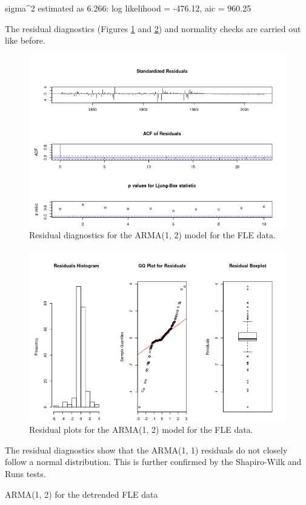 \begin{enumerate}[label=(\alph*)]
\begin{block}
sigma^2 estimated as 6.266:  log likelihood = -476.12,  aic = 960.25
\end{block}
\normalsize The residual diagnostics (Figures \ref{fig:tsdiag_fle_arma_12} and \ref{fig:res_fle_arma_12}) and normality checks are carried out like before.
\begin{figure}[!htb]
    \centering
    \includegraphics[width=\linewidth]{Images/P4/TSDiag_FLE_ARMA_12.png}
    \caption[Residual diagnostics for the ARMA(1, 2) model for the FLE data.]{Residual diagnostics for the ARMA(1, 2) model for the FLE data.}
    \label{fig:tsdiag_fle_arma_12}
\end{figure}
\begin{figure}[!htb]
    \centering
    \includegraphics[width=\linewidth]{Images/P4/Residuals_FLE_ARMA_12.png}
    \caption[Residual plots for the ARMA(1, 2) model for the FLE data.]{Residual plots for the ARMA(1, 2) model for the FLE data.}
    \label{fig:res_fle_arma_12}
\end{figure}
The residual diagnostics show that the ARMA(1, 1) residuals do not closely follow a normal distribution. This is further confirmed by the Shapiro-Wilk and Runs tests.
\small\begin{block}
ARMA(1, 2) for the detrended FLE data


\end{block}
\end{enumerate}
